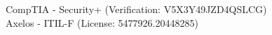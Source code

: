 CompTIA - Security+  (Verification:  V5X3Y49JZD4QSLCG)\\
Axelos - ITIL-F (License: 5477926.20448285)
